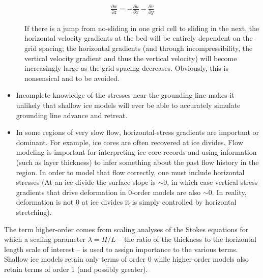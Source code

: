 \begin{align*}
\frac{\partial w}{\partial z} = -\frac{\partial u}{\partial x}-\frac{\partial v}{\partial y}
\end{align*}

\begin{description}
\item[]If there is a jump from no-sliding in one grid cell to sliding in the next, the horizontal velocity gradients at the bed will be entirely dependent on the grid spacing; the horizontal gradients (and through incompressibility, the vertical velocity gradient and thus the vertical velocity) will become increasingly large as the grid spacing decreases. Obviously, this is nonsensical and to be avoided.

\end{description}
\begin{itemize}
\item Incomplete knowledge of the stresses near the grounding line makes it unlikely that shallow ice models will ever be able to accurately simulate grounding line advance and retreat.
\item In some regions of very slow flow, horizontal-stress gradients are important or dominant. For example, ice cores are often recovered at ice divides. Flow modeling is important for interpreting ice core records and using information (such as layer thickness) to infer something about the past flow history in the region. In order to model that flow correctly, one must include horizontal stresses (At an ice divide the surface slope is \(\sim\)0, in which case vertical stress gradients that drive deformation in 0-order models are also \(\sim\)0. In reality, deformation is not 0 at ice divides it is simply controlled by horizontal stretching).
\end{itemize}

The term higher-order comes from scaling analyses of the Stokes equations for which a scaling parameter $\lambda=H/L$ -- the ratio of the thickness to the horizontal length scale of interest -- is used to assign importance to the various terms. Shallow ice models retain only terms of order 0 while higher-order models also retain terms of order 1 (and possibly greater).


